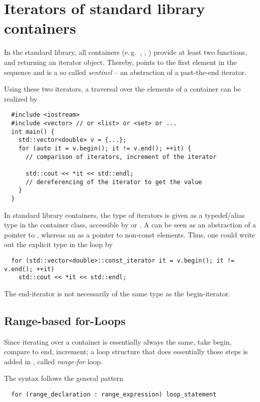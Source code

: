 \section{Iterators of standard library containers}
In the standard library, all containers (e.\,g.\ , , ) provide at least two functions,  and 
returning an iterator object. Thereby,  points to the first element in the sequence and  is a so called \emph{sentinel} -- an abstraction of a past-the-end iterator.

Using these two iterators, a traversal over the elements of a container can be realized by
%
\begin{verbatim}
  #include <iostream>
  #include <vector> // or <list> or <set> or ...
  int main() {
    std::vector<double> v = {...};
    for (auto it = v.begin(); it != v.end(); ++it) {
      // comparison of iterators, increment of the iterator

      std::cout << *it << std::endl;
      // dereferencing of the iterator to get the value
    }
  }
\end{verbatim}

In standard library containers, the type of iterators is given as a typedef/alias type in the container class, accessible by  or
. A  can be seen as an abstraction of a pointer to , whereas an  as a pointer to
non-const elements. Thus, one could write out the explicit type in the loop by
%
\begin{verbatim}
  for (std::vector<double>::const_iterator it = v.begin(); it != v.end(); ++it)
    std::cout << *it << std::endl;
\end{verbatim}

The\marginpar{[]\cxx{17}]} end-iterator is not necessarily of the same type as the begin-iterator.

\subsection{Range-based for-Loops}
Since iterating over a container is essentially always the same, take begin, compare to end, increment; a loop structure that does essentially
those steps is added in , called \emph{range-for} loop.

The syntax follows the general pattern
\begin{verbatim}
  for (range_declaration : range_expression) loop_statement
\end{verbatim}

